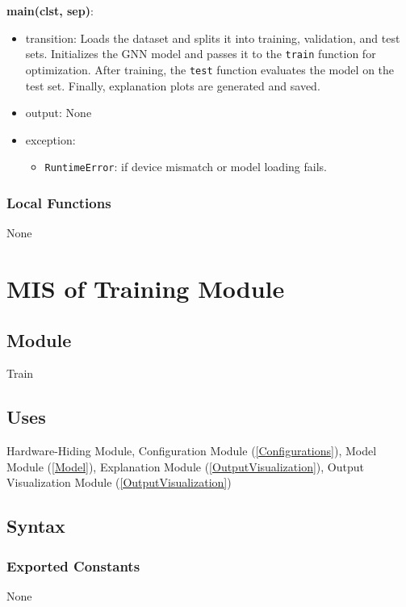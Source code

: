 \documentclass[12pt, titlepage]{article}
\begin{document}
\noindent \textbf{main(clst, sep)}:
\begin{itemize}
  \item transition: Loads the dataset and splits it into training, validation, and test sets. Initializes the GNN model and passes it to the \texttt{train} function for optimization. After training, the \texttt{test} function evaluates the model on the test set. Finally, explanation plots are generated and saved.
  \item output: None
  \item exception:
  \begin{itemize}
    \item \texttt{RuntimeError}: if device mismatch or model loading fails.
  \end{itemize}
\end{itemize}

\subsubsection{Local Functions}
None







\section{MIS of Training Module} \label{Train} 

\subsection{Module}
Train

\subsection{Uses}
Hardware-Hiding Module, Configuration Module (\ref{Configurations}), Model Module (\ref{Model}), Explanation Module (\ref{OutputVisualization}), Output Visualization Module (\ref{OutputVisualization})

\subsection{Syntax}

\subsubsection{Exported Constants}
None
\end{document}
